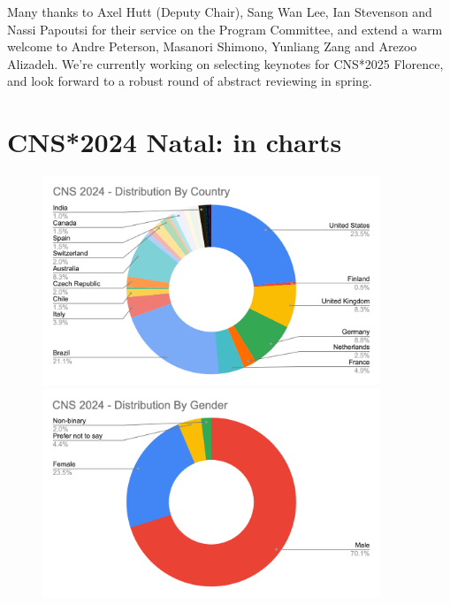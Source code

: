 \documentclass[11pt,a4paper,oneside]{article}
\begin{document}
Many thanks to Axel Hutt (Deputy Chair), Sang Wan Lee, Ian Stevenson and Nassi Papoutsi for their service on the Program Committee, and extend a warm welcome to Andre Peterson, Masanori Shimono, Yunliang Zang and Arezoo Alizadeh.
We're currently working on selecting keynotes for CNS*2025 Florence, and look forward to a robust round of abstract reviewing in spring.

\clearpage
\section*{CNS*2024 Natal: in charts}%
\begin{figure}[ht]
  \centering
  \includegraphics[width=0.9\textwidth]{images/cns2024-attendees-distribution-1}\\\vspace{3ex}
  \includegraphics[width=0.9\textwidth]{images/cns2024-attendees-distribution-gender-1}
\end{figure}
\end{document}
